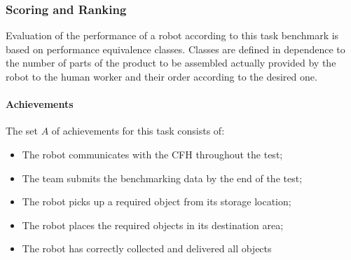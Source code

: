 \subsubsection{Scoring and Ranking}
\label{sssec:TaskFillaBoxScoring}

Evaluation of the performance of a robot according to this task benchmark is based on performance equivalence classes. Classes are defined in dependence to the number of parts of the product to be assembled actually provided by the robot to the human worker and their order according to the desired one.

\paragraph{Achievements} The set $A$ of achievements for this task consists of:
%
\begin{itemize}
\item The robot communicates with the CFH throughout the test;
\item The team submits the benchmarking data by the end of the test;
\item The robot picks up a required object from its storage location;
\item The robot places the required objects in its destination area;
\item The robot has correctly collected and delivered all objects
\end{itemize}
